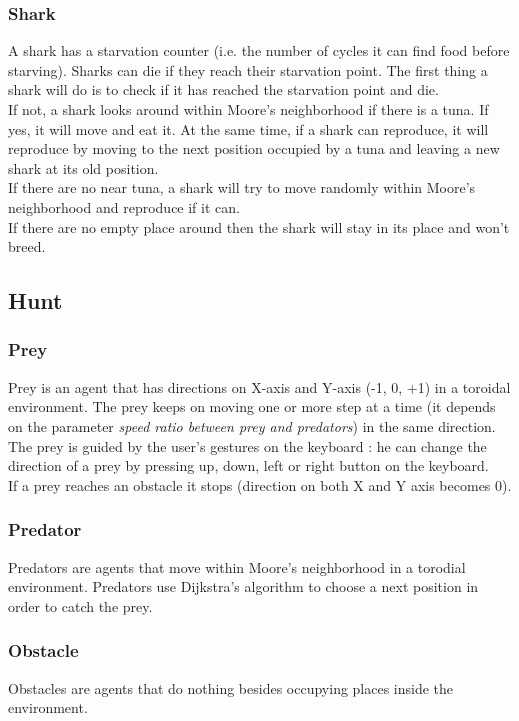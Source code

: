 \subsubsection{Shark}
A shark has a starvation counter (i.e. the number of cycles it can find food before starving). Sharks can die if they reach their starvation point. The first thing a shark will do is to check if it has reached the starvation point and die.\\
If not, a shark looks around within Moore's neighborhood if there is a tuna. If yes, it will move and eat it. At the same time, if a shark can reproduce, it will reproduce by moving to the next position occupied by a tuna and leaving a new shark at its old position.\\
If there are no near tuna, a shark will try to move randomly within Moore's neighborhood and reproduce if it can.\\
If there are no empty place around then the shark will stay in its place and won't breed.

\subsection{Hunt}

\subsubsection{Prey}
Prey is an agent that has directions on X-axis and Y-axis (-1, 0, +1) in a toroidal environment. The prey keeps on moving one or more step at a time (it depends on the parameter \textit{speed ratio between prey and predators}) in the same direction. The prey is guided by the user's gestures on the keyboard : he can change the direction of a prey by pressing  up, down, left or right button on the keyboard.\\
If a prey reaches an obstacle it stops (direction on both X and Y axis becomes 0).

\subsubsection{Predator}
Predators are agents that move within Moore's neighborhood in a torodial environment. Predators use Dijkstra's algorithm \cite{dijkstra} to choose a next position in order to catch the prey.

\subsubsection{Obstacle}
Obstacles are agents that do nothing besides occupying places inside the environment.

